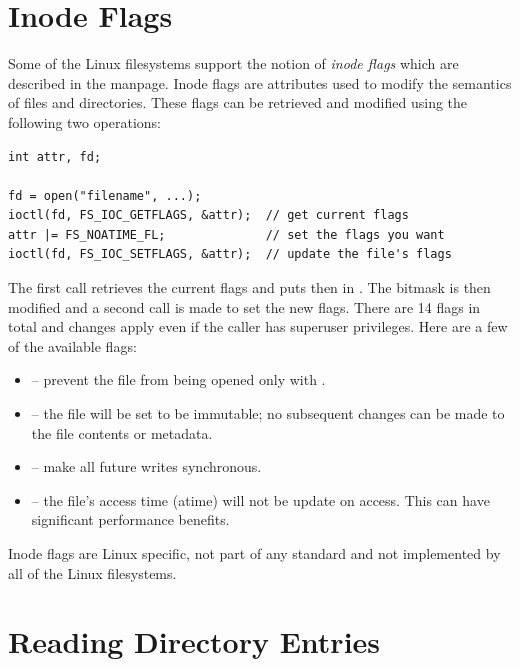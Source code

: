 
\section{Inode Flags}

Some of the Linux filesystems support the notion of \textit{inode flags} which are described in the  manpage. Inode flags are attributes used to modify the semantics of files and directories. These flags can be retrieved and modified using the following two  operations:

\begin{lstlisting}
int attr, fd;

fd = open("filename", ...);
ioctl(fd, FS_IOC_GETFLAGS, &attr);  // get current flags
attr |= FS_NOATIME_FL;              // set the flags you want
ioctl(fd, FS_IOC_SETFLAGS, &attr);  // update the file's flags
\end{lstlisting}

\noindent
The first call retrieves the current flags and puts then in . The bitmask is then modified and a second call is made to set the new flags. There are 14 flags in total and changes apply even if the caller has superuser privileges. Here are a few of the available flags:

\begin{itemize}
	\item {} --  prevent the file from being opened only with  .
	\item {} -- the file will be set to be immutable; no subsequent changes can be made to the 
		file contents or metadata.
	\item {} -- make all future writes synchronous.
	\item {} -- the file's access time (atime) will not be update on access. This can have significant
		performance benefits.
\end{itemize}

\noindent
Inode flags are Linux specific, not part of any standard and not implemented by all of the Linux filesystems.


\section{Reading Directory Entries}\label{prog-readdir}


